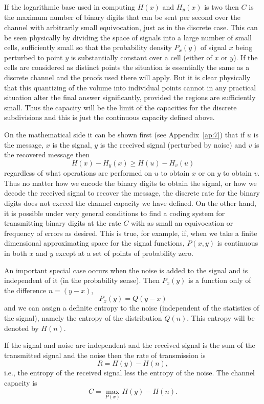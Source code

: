 If the logarithmic base used in computing $H(x)$ and $H_y(x)$ is two then
$C$ is the maximum number of binary digits that can be sent per second over
the channel with arbitrarily small equivocation, just as in the discrete
case.  This can be seen physically by dividing the space of signals into a
large number of small cells, sufficiently small so that the probability density
$P_x(y)$ of signal $x$ being perturbed to point $y$ is substantially
constant over a cell (either of $x$ or $y$).  If the cells are considered as
distinct points the situation is essentially the same as a discrete channel
and the proofs used there will apply.  But it is clear physically that this
quantizing of the volume into individual points cannot in any practical
situation alter the final answer significantly, provided the regions are
sufficiently small.  Thus the capacity will be the limit of the capacities for
the discrete subdivisions and this is just the continuous capacity defined
above.

On the mathematical side it can be shown first (see Appendix~\ref{ap:7})
that if $u$ is the message, $x$ is the signal, $y$ is the received signal
(perturbed by noise) and $v$ is the recovered message then
$$
H(x)-H_y(x)\geq H(u)-H_v(u)
$$
regardless of what operations are performed on $u$ to obtain $x$ or on $y$
to obtain $v$.  Thus no matter how we encode the binary digits to obtain
the signal, or how we decode the received signal to recover the message,
the discrete rate for the binary digits does not exceed the channel
capacity we have defined.  On the other hand, it is possible under very
general conditions to find a coding system for transmitting binary digits
at the rate $C$ with as small an equivocation or frequency of errors as
desired.  This is true, for example, if, when we take a finite dimensional
approximating space for the signal functions, $P(x,y)$ is continuous in
both $x$ and $y$ except at a set of points of probability zero.

An important special case occurs when the noise is added to the signal and
is independent  of it (in the probability sense).  Then $P_x(y)$ is a
function only of the difference $n=(y-x)$,
$$
P_x(y)=Q(y-x)
$$
and we can assign a definite entropy to the noise (independent of the
statistics of the signal), namely the entropy of the distribution $Q(n)$.
This entropy will be denoted by $H(n)$.

\begin{theorem}
\label{thm:16}
If the signal and noise are independent and the received signal is the sum
of the transmitted signal and the noise then the rate of transmission is
$$
R=H(y)-H(n),
$$
i.e., the entropy of the received signal less the entropy of the noise.
The channel capacity is
$$
C=\max_{P(x)} H(y)-H(n).
$$
\end{theorem}

